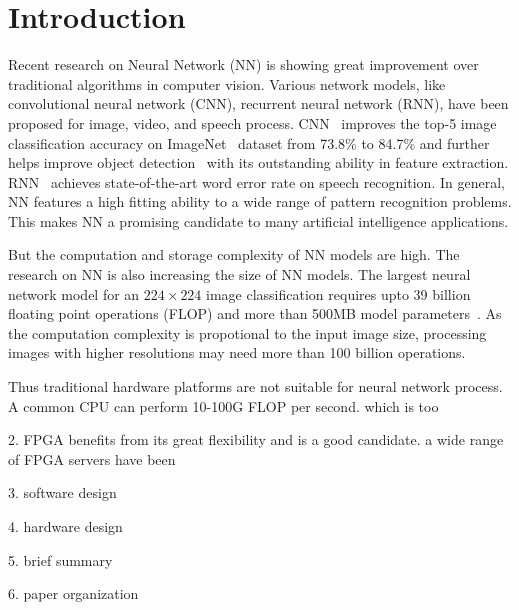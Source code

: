 \section{Introduction}

Recent research on Neural Network (NN) is showing great improvement over traditional algorithms in computer vision. Various network models, like convolutional neural network (CNN), recurrent neural network (RNN), have been proposed for image, video, and speech process. CNN~\cite{krizhevsky2012imagenet} improves the top-5 image classification accuracy on ImageNet~\cite{ILSVRC15} dataset from 73.8\% to 84.7\% and further helps improve object detection~\cite{girshick2014rich} with its outstanding ability in feature extraction. RNN~\cite{hannun2014deep} achieves state-of-the-art word error rate on speech recognition. In general, NN features a high fitting ability to a wide range of pattern recognition problems. This makes NN a promising candidate to many artificial intelligence applications.

But the computation and storage complexity of NN models are high. The research on NN is also increasing the size of NN models. The largest neural network model for an $224\times224$ image classification requires upto 39 billion floating point operations (FLOP) and more than 500MB model parameters~\cite{simonyan2014very}. As the computation complexity is propotional to the input image size, processing images with higher resolutions may need more than 100 billion operations.

Thus traditional hardware platforms are not suitable for neural network process. A common CPU can perform 10-100G FLOP per second. which is too  

2. FPGA benefits from its great flexibility and is a good candidate. a wide range of FPGA servers have been 

3. software design

4. hardware design

5. brief summary

6. paper organization
